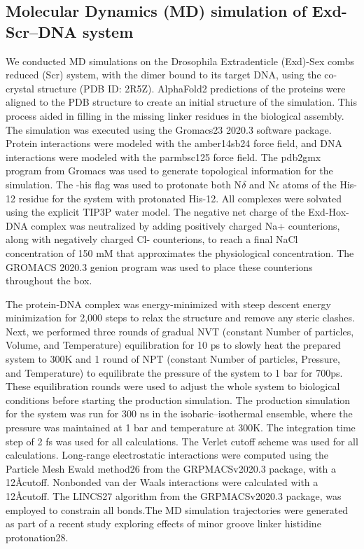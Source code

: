 \subsection{Molecular Dynamics (MD) simulation of Exd-Scr–DNA system}
We conducted MD simulations on the Drosophila Extradenticle (Exd)-Sex combs reduced (Scr) system, with the dimer bound to its target DNA, using the co-crystal structure (PDB ID: 2R5Z). AlphaFold2 predictions of the proteins were aligned to the PDB structure to create an initial structure of the simulation. This process aided in filling in the missing linker residues in the biological assembly. The simulation was executed using the Gromacs23 2020.3 software package. Protein interactions were modeled with the amber14sb24 force field, and DNA interactions were modeled with the parmbsc125 force field. The pdb2gmx program from Gromacs was used to generate topological information for the simulation. The -his flag was used to protonate both N$\delta$ and N$\epsilon$ atoms of the His-12 residue for the system with protonated His-12. All complexes were solvated using the explicit TIP3P water model. The negative net charge of the Exd-Hox-DNA complex was neutralized by adding positively charged Na+ counterions, along with negatively charged Cl- counterions, to reach a final NaCl concentration of 150 mM that approximates the physiological concentration. The GROMACS 2020.3 genion program was used to place these counterions throughout the box. 
\par
The protein-DNA complex was energy-minimized with steep descent energy minimization for 2,000 steps to relax the structure and remove any steric clashes. Next, we performed three rounds of gradual NVT (constant Number of particles, Volume, and Temperature) equilibration for 10 ps to slowly heat the prepared system to 300K and 1 round of NPT (constant Number of particles, Pressure, and Temperature) to equilibrate the pressure of the system to 1 bar for 700ps. These equilibration rounds were used to adjust the whole system to biological conditions before starting the production simulation. The production simulation for the system was run for 300 ns in the isobaric–isothermal ensemble, where the pressure was maintained at 1 bar and temperature at 300K. The integration time step of 2 fs was used for all calculations. The Verlet cutoff scheme was used for all calculations. Long-range electrostatic interactions were computed using the Particle Mesh Ewald method26 from the GRPMACSv2020.3 package, with a 12\AA cutoff. Nonbonded van der Waals interactions were calculated with a 12\AA cutoff. The LINCS27 algorithm from the GRPMACSv2020.3 package, was employed to constrain all bonds.The MD simulation trajectories were generated as part of a recent study exploring effects of minor groove linker histidine protonation28.
\\
